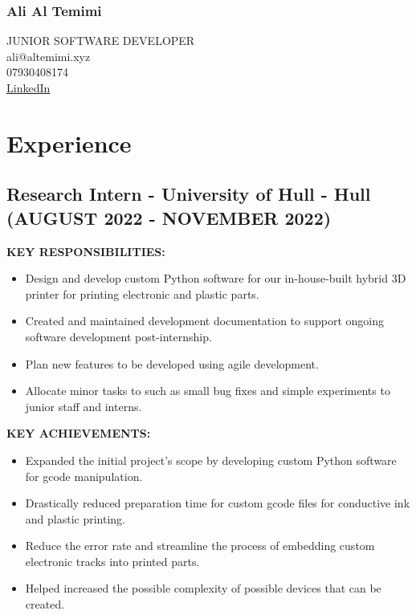 \documentclass{article}
\begin{document}
\begin{multicols}{2}
    \subsubsection{Ali Al Temimi}
    \raggedright\small JUNIOR SOFTWARE DEVELOPER\\
    \columnbreak
    \Large\raggedleft ali@altemimi.xyz \\ 07930408174 \\ \href{https://www.linkedin.com/in/ali-al-temimi-8995b4196/}{LinkedIn}
    \noindent
\end{multicols}

\section{Experience}
\subsection{Research Intern - \textnormal{University of Hull - Hull} \footnotesize{(AUGUST 2022 - NOVEMBER 2022)}}
\begin{minipage}[t]{1\textwidth}
    \footnotesize{\textbf{KEY RESPONSIBILITIES:}}
    \normalsize{}
    \begin{itemize}[leftmargin=*]
        \item Design and develop custom Python software for our in-house-built hybrid 3D printer for printing electronic and plastic parts. 
        \item Created and maintained development documentation to support ongoing software development post-internship.
        \item Plan new features to be developed using agile development.
        \item Allocate minor tasks to such as small bug fixes and simple experiments to junior staff and interns. 
    \end{itemize}
\end{minipage}
\hfill
\begin{minipage}[t]{1\textwidth}
    \footnotesize{\textbf{KEY ACHIEVEMENTS:}}
    \normalsize{}
    \begin{itemize}[leftmargin=*]
        \item Expanded the initial project’s scope by developing custom Python software for gcode manipulation.
        \item Drastically reduced preparation time for custom gcode files for conductive ink and plastic printing.
        \item Reduce the error rate and streamline the process of embedding custom electronic tracks into printed parts. 
        \item Helped increased the possible complexity of possible devices that can be created.  
    \end{itemize}
\end{minipage}
\end{document}
